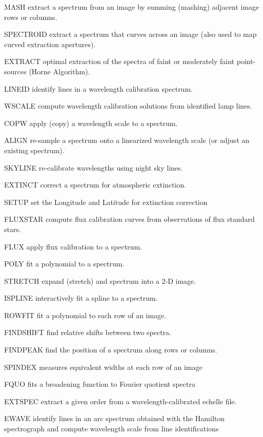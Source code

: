 {\newpage\clearpage
{}%
\begin{example}
  \item[MASH\hfill]{extract a spectrum from an image by summing (mashing)
       adjacent image rows or columns.}
  \item[SPECTROID\hfill]{extract a spectrum that curves across an image 
       (also used to map curved extraction apertures).}
  \item[EXTRACT\hfill]{optimal extraction of the spectra of faint or
       moderately faint point-sources (Horne Algorithm).}
  \item[LINEID\hfill]{identify lines in a wavelength calibration spectrum.}
  \item[WSCALE\hfill]{compute wavelength calibration solutions from
       identified lamp lines.}
  \item[COPW\hfill]{apply (copy) a wavelength scale to a spectrum.}
  \item[ALIGN\hfill]{re-sample a spectrum onto a linearized wavelength
       scale (or adjust an existing spectrum).}
  \item[SKYLINE\hfill]{re-calibrate wavelengths using night sky lines.}
  \item[EXTINCT\hfill]{correct a spectrum for atmospheric extinction.}
  \item[SETUP\hfill]{set the Longitude and Latitude for extinction correction}
  \item[FLUXSTAR\hfill]{compute flux calibration curves from observations 
       of flux standard stars.}
  \item[FLUX\hfill]{apply flux calibration to a spectrum.}
  \item[POLY\hfill]{fit a polynomial to a spectrum.}
  \item[STRETCH\hfill]{expand (stretch) and spectrum into a 2-D image.}
  \item[ISPLINE\hfill]{interactively fit a spline to a spectrum.}
  \item[ROWFIT\hfill]{fit a polynomial to each row of an image.}
  \item[FINDSHIFT\hfill]{find relative shifts between two spectra.}
  \item[FINDPEAK\hfill]{find the position of a spectrum along rows or 
       columns.}
  \item[SPINDEX\hfill]{measures equivalent widths at each row of an image}
  \item[FQUO\hfill]{fits a broadening function to Fourier quotient spectra}
  \item[EXTSPEC\hfill]{extract a given order from a wavelength-calibrated
       echelle file.}
  \item[EWAVE\hfill]{identify lines in an arc spectrum obtained with the
        Hamilton spectrograph and compute wavelength scale from line
        identifications}
\end{example}%
\lthtmlfigureZ
\lthtmlcheckvsize\clearpage}

